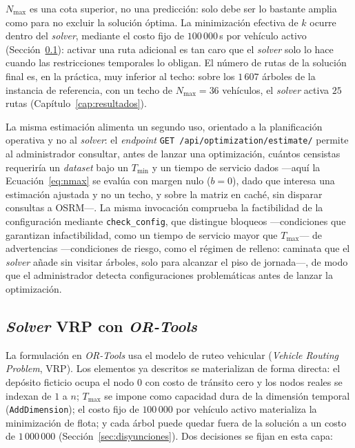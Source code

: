 $N_{\max}$ es una cota superior, no una predicción: solo debe ser lo bastante amplia como para no
excluir la solución óptima. La minimización efectiva de $k$ ocurre dentro del \textit{solver},
mediante el costo fijo de $100\,000$\,s por vehículo activo (Sección~\ref{sec:solver}): activar una
ruta adicional es tan caro que el \textit{solver} solo lo hace cuando las restricciones temporales
lo obligan. El número de rutas de la solución final es, en la práctica, muy inferior al techo: sobre
los $1\,607$ árboles de la instancia de referencia, con un techo de $N_{\max}=36$ vehículos, el
\textit{solver} activa $25$ rutas (Capítulo~\ref{cap:resultados}).

La misma estimación alimenta un segundo uso, orientado a la planificación operativa y no al
\textit{solver}: el \textit{endpoint} \texttt{GET /api/optimization/estimate/} permite al
administrador consultar, antes de lanzar una optimización, cuántos censistas requeriría un
\textit{dataset} bajo un $T_{\min}$ y un tiempo de servicio dados ---aquí la
Ecuación~\ref{eq:nmax} se evalúa con margen nulo ($b=0$), dado que interesa una estimación ajustada
y no un techo, y sobre la matriz en caché, sin disparar consultas a OSRM---. La misma invocación
comprueba la factibilidad de la configuración mediante \texttt{check\_config}, que distingue
bloqueos ---condiciones que garantizan infactibilidad, como un tiempo de servicio mayor que
$T_{\max}$--- de advertencias ---condiciones de riesgo, como el régimen de relleno: caminata que el
\textit{solver} añade sin visitar árboles, solo para alcanzar el piso de jornada---, de modo que el
administrador detecta configuraciones problemáticas antes de lanzar la optimización.

\subsection{\textit{Solver} VRP con \textit{OR-Tools}}
\label{sec:solver}

La formulación en \textit{OR-Tools} \citep{ortools} usa el modelo de ruteo vehicular
(\textit{Vehicle Routing Problem}, VRP). Los elementos ya descritos se materializan de forma
directa: el depósito ficticio ocupa el nodo $0$ con costo de tránsito cero y los nodos reales se
indexan de $1$ a $n$; $T_{\max}$ se impone como capacidad dura de la dimensión temporal
(\texttt{AddDimension}); el costo fijo de $100\,000$ por vehículo activo materializa la
minimización de flota; y cada árbol puede quedar fuera de la solución a un costo de $1\,000\,000$
(Sección~\ref{sec:disyunciones}). Dos decisiones se fijan en esta capa:


